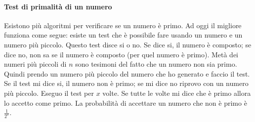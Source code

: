 \paragraph{Test di primalità di un numero} Esistono più algoritmi per verificare se un numero è primo. Ad oggi il migliore funziona come segue: esiste un test che è possibile fare usando un numero e un numero più piccolo. Questo test disce si o no. Se dice si, il numero è composto; se dice no, non sa se il numero è composto (per quel numero è primo). Metà dei numeri più piccoli di $n$ sono tesimoni del fatto che un numero non sia primo. Quindi prendo un numero più piccolo del numero che ho generato e faccio il test. Se il test mi dice si, il numero non è primo; se mi dice no riprovo con un numero più piccolo. Eseguo il test per $x$ volte. Se tutte le volte mi dice che è primo allora lo accetto come primo. La probabilità di accettare un numero che non è primo è $\frac{1}{2^x}$.
